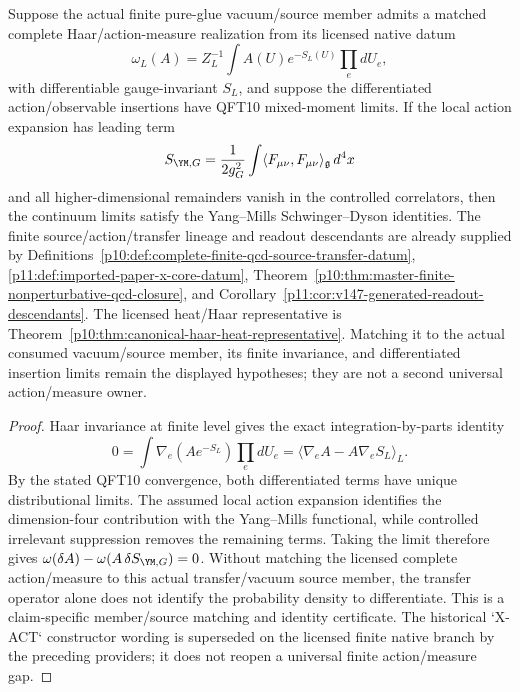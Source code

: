 \documentclass[12pt,a4paper]{article}
\begin{document}
\begin{lemma}
\label{p12:lem:ym-sd-identification}
Suppose the actual finite pure-glue vacuum/source member admits a
matched complete Haar/action-measure realization from its licensed native
datum
\[
\omega_L(A)=Z_L^{-1}\int A(U)e^{-S_L(U)}\prod_e dU_e,
\]
with differentiable gauge-invariant \(S_L\), and suppose the differentiated action/observable insertions have QFT10 mixed-moment limits.  If the local action expansion has leading term
\[
S_{\YM,G}=\frac1{2g_G^2}\int\langle F_{\mu\nu},F_{\mu\nu}\rangle_{\mathfrak g}\,d^4x
\]
and all higher-dimensional remainders vanish in the controlled correlators, then the continuum limits satisfy the Yang--Mills Schwinger--Dyson identities.  The finite source/action/transfer lineage and readout descendants are already supplied by Definitions~\ref{p10:def:complete-finite-qcd-source-transfer-datum}, \ref{p11:def:imported-paper-x-core-datum}, Theorem~\ref{p10:thm:master-finite-nonperturbative-qcd-closure}, and Corollary~\ref{p11:cor:v147-generated-readout-descendants}. The licensed heat/Haar representative is Theorem~\ref{p10:thm:canonical-haar-heat-representative}. Matching it to the actual consumed vacuum/source member, its finite invariance, and differentiated insertion limits remain the displayed hypotheses; they are not a second universal action/measure owner.
\end{lemma}
\begin{proof}
Haar invariance at finite level gives the exact integration-by-parts identity
\[
0=\int \nabla_e(Ae^{-S_L})\prod_e dU_e
=\langle\nabla_eA-A\nabla_eS_L\rangle_L.
\]
By the stated QFT10 convergence, both differentiated terms have unique distributional limits.  The assumed local action expansion identifies the dimension-four contribution with the Yang--Mills functional, while controlled irrelevant suppression removes the remaining terms.  Taking the limit therefore gives \(\omega(\delta A)-\omega(A\,\delta S_{\YM,G})=0\).  Without matching the licensed complete action/measure to this actual transfer/vacuum source member, the transfer operator alone does not identify the probability density to differentiate. This is a claim-specific member/source matching and identity certificate. The historical `X-ACT` constructor wording is superseded on the licensed finite native branch by the preceding providers; it does not reopen a universal finite action/measure gap.
\end{proof}
\end{document}
